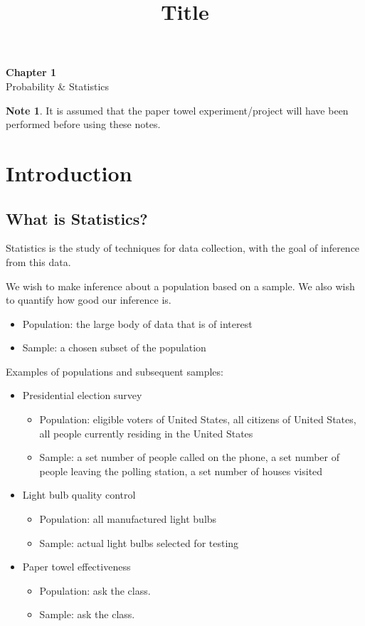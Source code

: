 \documentclass[11pt]{article}
\theoremstyle{definition}
\newtheorem{note}{Note}
\begin{document}
\title{Title}

\thispagestyle{empty}

\begin{center}
{\LARGE \bf Chapter 1}\\
{\large Probability \& Statistics}
\end{center}

\begin{note}
	It is assumed that the paper towel experiment/project will have been performed before using these notes.
\end{note}

\section{Introduction}

\subsection{What is Statistics?}
Statistics is the study of techniques for data collection, with the goal of inference from this data.

We wish to make inference about a population based on a sample. We also wish to quantify how good our inference is.
\begin{itemize}
	\item Population: the large body of data that is of interest
	\item Sample: a chosen subset of the population
\end{itemize}

Examples of populations and subsequent samples:
\begin{itemize}
	\item Presidential election survey
		\begin{itemize}
			\item Population: eligible voters of United States, all citizens of United States, all people currently residing in the United States
			\item Sample: a set number of people called on the phone, a set number of people leaving the polling station, a set number of houses visited
		\end{itemize}
	\item Light bulb quality control
		\begin{itemize}
			\item Population: all manufactured light bulbs
			\item Sample: actual light bulbs selected for testing
		\end{itemize}
	\item Paper towel effectiveness
		\begin{itemize}
			\item Population: ask the class.
			\item Sample: ask the class.
		\end{itemize}
\end{itemize}
\end{document}
